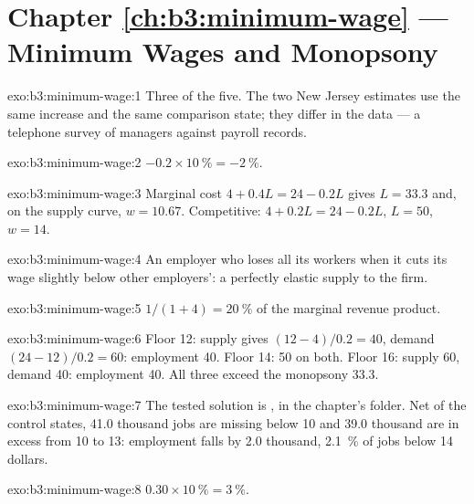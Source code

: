 \section*{Chapter \ref{ch:b3:minimum-wage} --- Minimum Wages and Monopsony}

\begin{solution}{exo:b3:minimum-wage:1}
Three of the five. The two New Jersey estimates use the same increase and the same
comparison state; they differ in the data --- a telephone survey of managers against
payroll records. %
\end{solution}

\begin{solution}{exo:b3:minimum-wage:2}
$-0.2 \times 10~\% = -2~\%$.
\end{solution}

\begin{solution}{exo:b3:minimum-wage:3}
Marginal cost $4 + 0.4L = 24 - 0.2L$ gives $L = 33.3$ and, on the supply curve, $w = 10.67$. Competitive:
$4 + 0.2L = 24 - 0.2L$, $L = 50$, $w = 14$.
\end{solution}

\begin{solution}{exo:b3:minimum-wage:4}
An employer who loses all its workers when it cuts its wage slightly below other
employers': a perfectly elastic supply to the firm.
\end{solution}

\begin{solution}{exo:b3:minimum-wage:5}
$1/(1 + 4) = 20~\%$ of the marginal revenue product.
\end{solution}

\begin{solution}{exo:b3:minimum-wage:6}
Floor 12: supply gives $(12 - 4)/0.2 = 40$, demand $(24 - 12)/0.2 = 60$: employment 40. Floor 14: 50 on both.
Floor 16: supply 60, demand 40: employment 40. All three exceed the monopsony 33.3.
\end{solution}

\begin{solution}{exo:b3:minimum-wage:7}
The tested solution is , in the chapter's 
folder. Net of the control states, 41.0 thousand jobs are missing below 10 and 39.0 thousand
are in excess from 10 to 13: employment falls by 2.0 thousand, 2.1~\% of jobs below 14
dollars. %
\end{solution}

\begin{solution}{exo:b3:minimum-wage:8}
$0.30 \times 10~\% = 3~\%$.
\end{solution}

